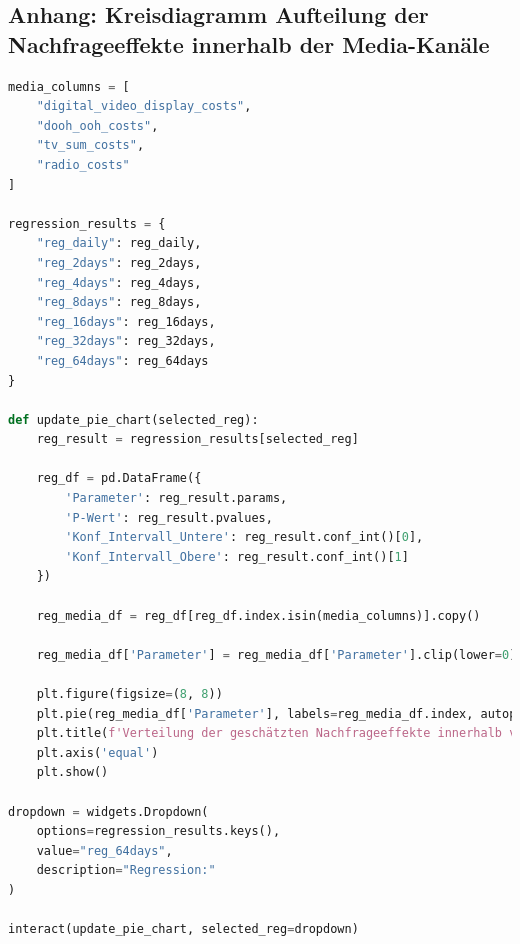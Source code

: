 \documentclass{common/nak}
\numberwithin{equation}{subsection}
\begin{document}
\subsection*{Anhang: Kreisdiagramm Aufteilung der Nachfrageeffekte innerhalb der Media-Kanäle}
\label{AufteilungDerNachfrageeffekt}
\begin{lstlisting}[language=Python, linewidth=\textwidth]
media_columns = [
    "digital_video_display_costs", 
    "dooh_ooh_costs", 
    "tv_sum_costs",
    "radio_costs"
]

regression_results = {
    "reg_daily": reg_daily,
    "reg_2days": reg_2days,
    "reg_4days": reg_4days,
    "reg_8days": reg_8days,
    "reg_16days": reg_16days,
    "reg_32days": reg_32days,
    "reg_64days": reg_64days
}

def update_pie_chart(selected_reg):
    reg_result = regression_results[selected_reg]
    
    reg_df = pd.DataFrame({
        'Parameter': reg_result.params,
        'P-Wert': reg_result.pvalues,
        'Konf_Intervall_Untere': reg_result.conf_int()[0],
        'Konf_Intervall_Obere': reg_result.conf_int()[1]
    })
    
    reg_media_df = reg_df[reg_df.index.isin(media_columns)].copy()
    
    reg_media_df['Parameter'] = reg_media_df['Parameter'].clip(lower=0)
    
    plt.figure(figsize=(8, 8))
    plt.pie(reg_media_df['Parameter'], labels=reg_media_df.index, autopct='%1.1f%%', startangle=140)
    plt.title(f'Verteilung der geschätzten Nachfrageeffekte innerhalb von Media-Kanäle in {selected_reg} ')
    plt.axis('equal') 
    plt.show()

dropdown = widgets.Dropdown(
    options=regression_results.keys(),
    value="reg_64days",  
    description="Regression:"
)

interact(update_pie_chart, selected_reg=dropdown)
\end{lstlisting}

\newpage
\end{document}
